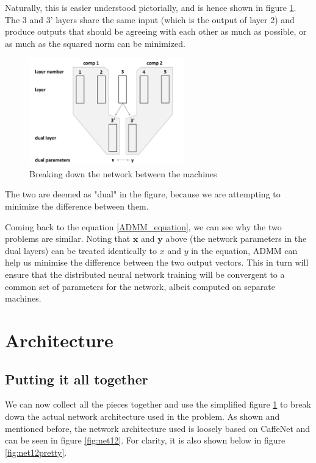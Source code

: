 \documentclass[a4paper, 11pt]{article}
\numberwithin{equation}{section}
\begin{document}
	Naturally, this is easier understood pictorially, and is hence shown in figure \ref{fig:dual-training}. The 3 and 3' layers share the same input (which is the output of layer 2) and produce outputs that should be agreeing with each other as much as possible, or as much as the squared norm can be minimized.
	
	\begin{figure}[!h]
		\centering
		\includegraphics[page=1,width=0.60\textwidth]{dual-training.pdf}
		\caption{\label{fig:dual-training}{Breaking down the network between the machines}}
	\end{figure}
	
	The two are deemed as "dual" in the figure, because we are attempting to minimize the difference between them.
	
	Coming back to the equation \ref{ADMM_equation}, we can see why the two problems are similar. Noting that $\boldsymbol x$ and $\boldsymbol y$ above (the network parameters in the dual layers) can be treated identically to $x$ and $y$ in the equation, ADMM can help us minimise the difference between the two output vectors. This in turn will ensure that the distributed neural network training will be convergent to a common set of parameters for the network, albeit computed on separate machines.
	
	\section{Architecture}
	
	\subsection{Putting it all together}
	
	We can now collect all the pieces together and use the simplified figure \ref{fig:dual-training} to break down the actual network architecture used in the problem. As shown and mentioned before, the network architecture used is loosely based on CaffeNet and can be seen in figure \ref{fig:net12}. For clarity, it is also shown below in figure \ref{fig:net12pretty}.
	
\end{document}

